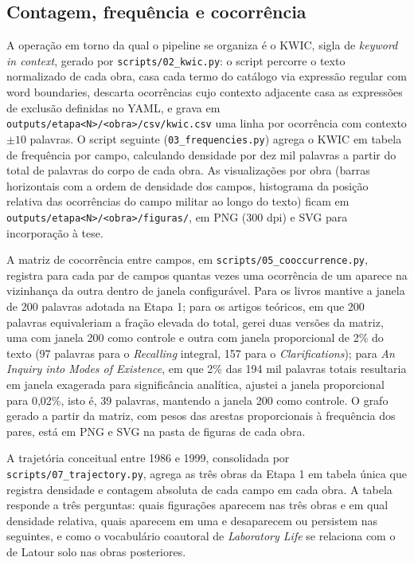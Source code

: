 \subsection{Contagem, frequência e cocorrência}

A operação em torno da qual o pipeline se organiza é o KWIC, sigla de \emph{keyword in context}, gerado por \texttt{scripts/02\_kwic.py}: o script percorre o texto normalizado de cada obra, casa cada termo do catálogo via expressão regular com word boundaries, descarta ocorrências cujo contexto adjacente casa as expressões de exclusão definidas no YAML, e grava em \texttt{outputs/etapa<N>/<obra>/csv/kwic.csv} uma linha por ocorrência com contexto $\pm 10$ palavras. O script seguinte (\texttt{03\_frequencies.py}) agrega o KWIC em tabela de frequência por campo, calculando densidade por dez mil palavras a partir do total de palavras do corpo de cada obra. As visualizações por obra (barras horizontais com a ordem de densidade dos campos, histograma da posição relativa das ocorrências do campo militar ao longo do texto) ficam em \texttt{outputs/etapa<N>/<obra>/figuras/}, em PNG (300 dpi) e SVG para incorporação à tese.

A matriz de cocorrência entre campos, em \texttt{scripts/05\_cooccurrence.py}, registra para cada par de campos quantas vezes uma ocorrência de um aparece na vizinhança da outra dentro de janela configurável. Para os livros mantive a janela de 200 palavras adotada na Etapa 1; para os artigos teóricos, em que 200 palavras equivaleriam a fração elevada do total, gerei duas versões da matriz, uma com janela 200 como controle e outra com janela proporcional de 2\% do texto (97 palavras para o \emph{Recalling} integral, 157 para o \emph{Clarifications}); para \emph{An Inquiry into Modes of Existence}, em que 2\% das 194 mil palavras totais resultaria em janela exagerada para significância analítica, ajustei a janela proporcional para 0,02\%, isto é, 39 palavras, mantendo a janela 200 como controle. O grafo gerado a partir da matriz, com pesos das arestas proporcionais à frequência dos pares, está em PNG e SVG na pasta de figuras de cada obra.

A trajetória conceitual entre 1986 e 1999, consolidada por \texttt{scripts/07\_trajectory.py}, agrega as três obras da Etapa 1 em tabela única que registra densidade e contagem absoluta de cada campo em cada obra. A tabela responde a três perguntas: quais figurações aparecem nas três obras e em qual densidade relativa, quais aparecem em uma e desaparecem ou persistem nas seguintes, e como o vocabulário coautoral de \emph{Laboratory Life} se relaciona com o de Latour solo nas obras posteriores.

